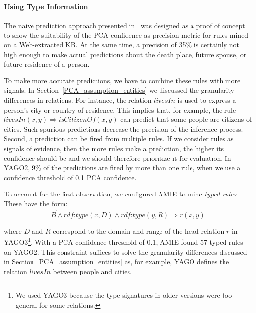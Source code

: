 \paragraph{Using Type Information}
The naive prediction approach presented in~\cite{amie} was designed as a proof of concept 
to show the suitability of the PCA confidence as precision metric for rules mined on a Web-extracted KB. 
At the same time, a precision of 35\% is certainly not high enough to make actual predictions about the death place, future spouse, or future residence of a person. 

To make more accurate predictions, we have to combine these rules with more signals. In Section~\ref{PCA_assumption_entities} we discussed the granularity
differences in relations. For instance, the relation $livesIn$ is used to express a person's city or country of residence. 
This implies that, for example, the rule 
$livesIn(x, y) \Rightarrow isCitizenOf(x, y)$ can predict that some people are citizens of cities. Such spurious predictions decrease the precision
of the inference process.
Second, a prediction can be fired from multiple rules. If we consider rules as signals of evidence,  
then the more rules make a prediction, the higher its confidence should be and we should therefore prioritize it for evaluation.
In YAGO2, 9\% of the predictions are fired by more than one rule, when we use a confidence threshold of 0.1 PCA confidence. 

To account for the first observation, we configured AMIE to mine \emph{typed rules}. These have the form:
\[
 \vec{B} \wedge \textit{rdf:type}(x, D) \wedge \textit{rdf:type}(y, R) \Rightarrow r(x, y)
\]

\noindent where $D$ and $R$ correspond to the domain and range of the head relation $r$ in YAGO3\footnote{We used YAGO3 because the type signatures in older versions were too general for some relations.}. 
With a PCA confidence threshold of 0.1, AMIE found 57 typed rules on YAGO2.
This constraint suffices to solve the granularity differences discussed in Section~\ref{PCA_assumption_entities} as, for example, 
YAGO defines the relation $livesIn$ between people and cities.

